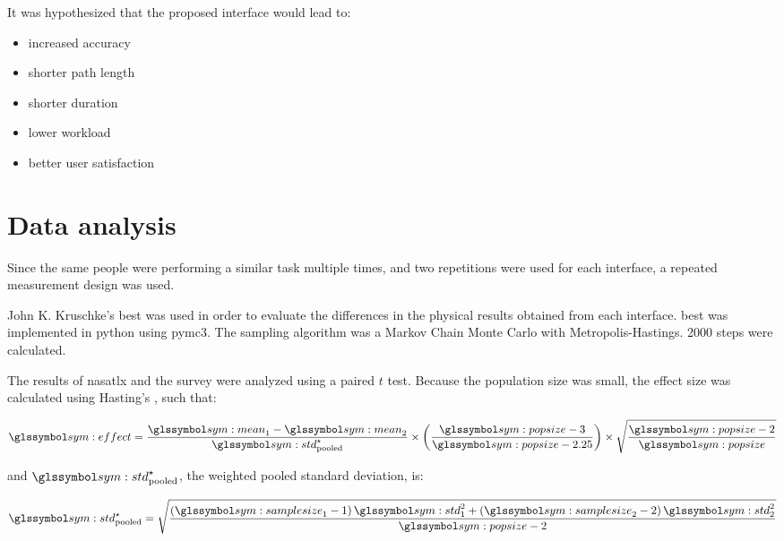   It was hypothesized that the proposed interface would lead to:

  \begin{itemize}
    \item increased accuracy
    \item shorter path length
    \item shorter duration
    \item lower workload
    \item better user satisfaction
  \end{itemize}
  
\section{Data analysis}
  Since the same people were performing a similar task multiple times, and two repetitions were used for each interface, a repeated measurement design was used.
  
  John K. Kruschke's \gls{best} was used in order to evaluate the differences in the physical results obtained from each interface.
  \gls{best} was implemented in \gls{python} using \gls{pymc3}.
  The sampling algorithm was a Markov Chain Monte Carlo with Metropolis-Hastings.
  2000 steps were calculated.

  The results of \gls{nasatlx} and the survey were analyzed using a paired $t$ test. Because the population size was small, the effect size was calculated using Hasting's , such that:

  \begin{equation}
    \sym{effect} = \frac{\sym{mean}_1 - \sym{mean}_2}{\sym{std}^\star_\mathrm{pooled}} \times \left(\frac{\sym{popsize} - 3}{\sym{popsize}-2.25}\right) \times \sqrt{\frac{\sym{popsize}-2}{\sym{popsize}}}
  \end{equation}

  \noindent and $\sym{std}^\star_\mathrm{pooled}$, the weighted pooled standard deviation, is:

  \begin{equation}
    \sym{std}^\star_\mathrm{pooled} = \sqrt{\frac{\left(\sym{samplesize}_1-1\right) \sym{std}_1^2 + \left(\sym{samplesize}_2-2\right)\sym{std}_2^2}{\sym{popsize}-2}}
  \end{equation}
